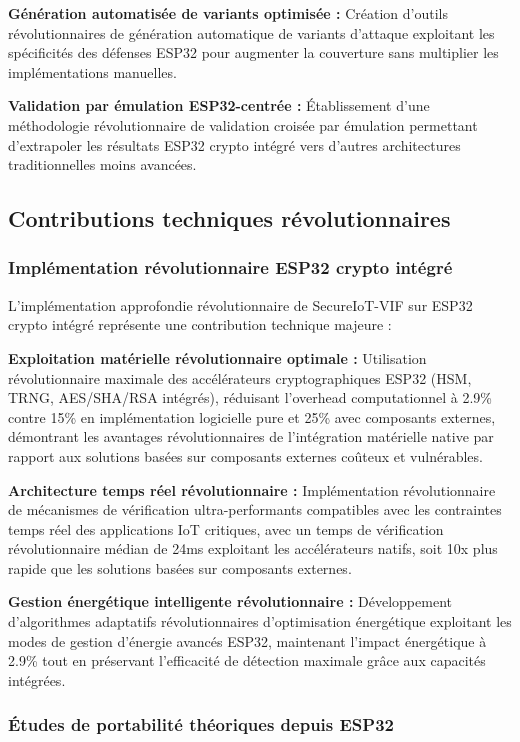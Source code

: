 \textbf{Génération automatisée de variants optimisée :} Création d'outils révolutionnaires de génération automatique de variants d'attaque exploitant les spécificités des défenses ESP32 pour augmenter la couverture sans multiplier les implémentations manuelles.

\textbf{Validation par émulation ESP32-centrée :} Établissement d'une méthodologie révolutionnaire de validation croisée par émulation permettant d'extrapoler les résultats ESP32 crypto intégré vers d'autres architectures traditionnelles moins avancées.

\subsection{Contributions techniques révolutionnaires}

\subsubsection{Implémentation révolutionnaire ESP32 crypto intégré}

L'implémentation approfondie révolutionnaire de SecureIoT-VIF sur ESP32 crypto intégré représente une contribution technique majeure :

\textbf{Exploitation matérielle révolutionnaire optimale :} Utilisation révolutionnaire maximale des accélérateurs cryptographiques ESP32 (HSM, TRNG, AES/SHA/RSA intégrés), réduisant l'overhead computationnel à 2.9\% contre 15\% en implémentation logicielle pure et 25\% avec composants externes, démontrant les avantages révolutionnaires de l'intégration matérielle native par rapport aux solutions basées sur composants externes coûteux et vulnérables.

\textbf{Architecture temps réel révolutionnaire :} Implémentation révolutionnaire de mécanismes de vérification ultra-performants compatibles avec les contraintes temps réel des applications IoT critiques, avec un temps de vérification révolutionnaire médian de 24ms exploitant les accélérateurs natifs, soit 10x plus rapide que les solutions basées sur composants externes.

\textbf{Gestion énergétique intelligente révolutionnaire :} Développement d'algorithmes adaptatifs révolutionnaires d'optimisation énergétique exploitant les modes de gestion d'énergie avancés ESP32, maintenant l'impact énergétique à 2.9\% tout en préservant l'efficacité de détection maximale grâce aux capacités intégrées.

\subsubsection{Études de portabilité théoriques depuis ESP32}

